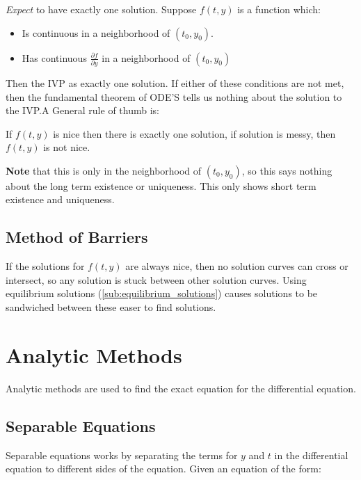 \documentclass{article}
\begin{document}
\textit{Expect} to have exactly one solution. Suppose $f(t,y)$ is a function
which:

\begin{itemize}
  \item Is continuous in a neighborhood of  $(t_0,y_0)$.
  \item Has continuous $\frac{\partial f}{\partial y}$ in a neighborhood of
    $(t_0,y_0)$
\end{itemize}

Then the IVP as exactly one solution. If either of these conditions are not
met, then the fundamental theorem of ODE'S tells us nothing about the solution
to the IVP.\@ A General rule of thumb is:

\begin{displayquote}
  If $f(t,y)$ is nice then there is exactly one solution, if solution is messy,
  then $f(t,y)$ is not nice.
\end{displayquote}

\textbf{Note} that this is only in the neighborhood of $(t_0,y_0)$, so this
says nothing about the long term existence or uniqueness. This only shows
short term existence and uniqueness.

\subsection{Method of Barriers}\label{sub:method_of_barriers}

If the solutions for $f(t,y)$ are always nice, then no solution curves can
cross or intersect, so any solution is stuck between other solution curves.
Using equilibrium solutions (\ref{sub:equilibrium_solutions}) causes solutions to be sandwiched between these
easer to find solutions.

\section{Analytic Methods}\label{sec:analytic_methods}

Analytic methods are used to find the exact equation for the differential
equation.

\subsection{Separable Equations}\label{sub:separable_equations}

Separable equations works by separating the terms for $y$ and $t$ in the
differential equation to different sides of the equation. Given an equation of
the form:
\end{document}
